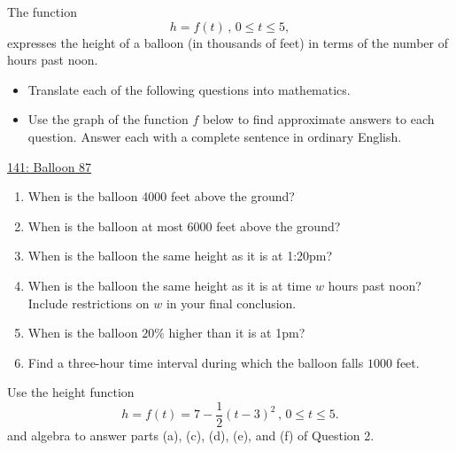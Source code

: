 \documentclass{ximera}
\begin{document}
\begin{question} \label{Qfmrfme300}
\item The function 
\[
 h =  f(t) \, , \, 0\leq t \leq 5,
\] 
expresses the height of a balloon (in thousands of feet) in terms of the number of hours past noon.

\begin{itemize}
\item Translate each of the following questions into mathematics.
\item Use the graph of the function $f$ below to find approximate answers to each question. Answer each with a complete sentence in ordinary English.
\end{itemize}

\begin{onlineOnly}
   \begin{center}
\end{center}
\end{onlineOnly}

\href{https://www.desmos.com/calculator/ovrcmobayk}{141: Balloon 87}


\begin{enumerate}
\item When is the balloon 4000 feet above the ground?

\item When is the balloon at most 6000 feet above the ground?

\item When is the balloon the same height as it is at 1:20pm?

\item When is the balloon the same height as it is at time $w$ hours past noon? Include restrictions on $w$ in your final conclusion.

\item When is the balloon $20\%$ higher than it is at 1pm?

\item Find a three-hour time interval during which the balloon falls $1000$ feet.
\end{enumerate}
\end{question}

\begin{question} \label{Qerf3r3}
Use the height function 
\[
  h = f(t) = 7 - \frac{1}{2}\left( t-3 \right)^2 \, , \, 0 \leq t \leq 5.
\]
and algebra to answer parts (a), (c), (d), (e), and (f) of Question 2.

\end{question}
\end{document}
